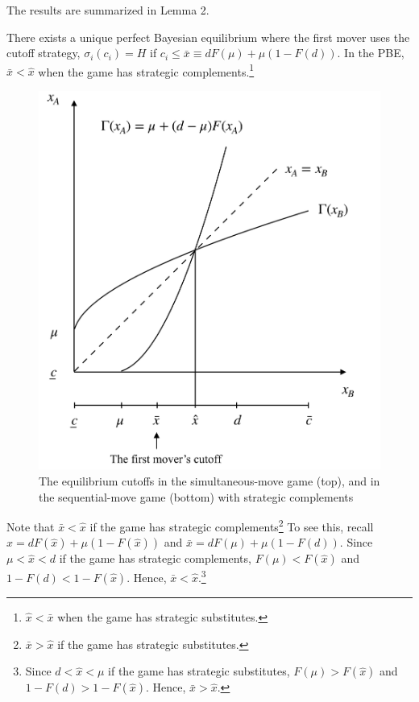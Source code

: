 \documentclass[12pt,english]{article}
\begin{document}
The results are summarized in Lemma 2.
\begin{lem}
There exists a unique perfect Bayesian equilibrium where the first mover uses the cutoff strategy, $\sigma_i(c_i)=H$ if $c_i\leq \bar{x} \equiv dF(\mu)+\mu(1-F(d))$.  In the PBE, $\bar{x}<\hat{x}$ when the game has strategic complements.\footnote{$\hat{x}<\bar{x}$ when the game has strategic substitutes.}
\end{lem}\par
\begin{figure}[t]
\centering
	\includegraphics[scale=0.19]{fig2.jpg}
	\caption{The equilibrium cutoffs in the simultaneous-move game (top), and in the sequential-move game (bottom) with strategic complements}
\end{figure}
Note that $\bar{x}<\hat{x}$ if the game has strategic complements\footnote{$\bar{x}>\hat{x}$ if the game has strategic substitutes.} To see this, recall $\hat{x}=dF(\hat{x})+\mu(1-F(\hat{x}))$ and $\bar{x}=dF(\mu)+\mu(1-F(d))$. Since $\mu<\hat{x}<d$ if the game has strategic complements, $F(\mu)<F(\hat{x})$ and $1-F(d)<1-F(\hat{x})$. Hence, $\bar{x}<\hat{x}$.\footnote{Since $d<\hat{x}<\mu$ if the game has strategic substitutes, $F(\mu)>F(\hat{x})$ and $1-F(d)>1-F(\hat{x})$. Hence, $\bar{x}>\hat{x}$.}\par
\end{document}
